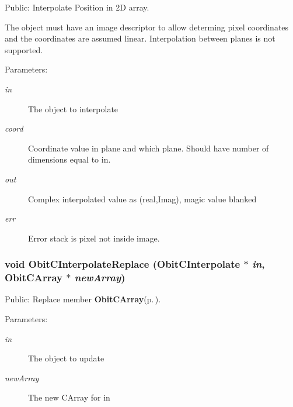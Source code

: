 Public: Interpolate Position in 2D array. 

The object must have an image descriptor to allow determing pixel coordinates and the coordinates are assumed linear. Interpolation between planes is not supported. \begin{Desc}
\item[Parameters:]
\begin{description}
\item[{\em in}]The object to interpolate \item[{\em coord}]Coordinate value in plane and which plane. Should have number of dimensions equal to in. \item[{\em out}]Complex interpolated value as (real,Imag), magic value blanked \item[{\em err}]Error stack is pixel not inside image. \end{description}
\end{Desc}
\subsubsection{\setlength{\rightskip}{0pt plus 5cm}void Obit\-CInterpolate\-Replace ({\bf Obit\-CInterpolate} $\ast$ {\em in}, {\bf Obit\-CArray} $\ast$ {\em new\-Array})}\label{ObitCInterpolate_8h_a9}


Public: Replace member {\bf Obit\-CArray}{\rm (p.\,\pageref{structObitCArray})}. 

\begin{Desc}
\item[Parameters:]
\begin{description}
\item[{\em in}]The object to update \item[{\em new\-Array}]The new CArray for in \end{description}
\end{Desc}
